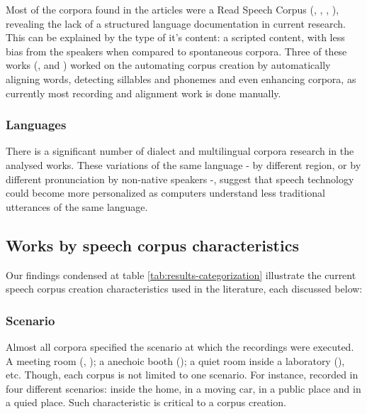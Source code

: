 \documentclass[conference]{IEEEtran}
\begin{document}
Most of the corpora found in the articles were a Read Speech Corpus (\cite{almeman2018building}, \cite{ruilan2016improving}, \cite{klessa2013paralingua}, \cite{clopper2006nationwide}), revealing the lack of a structured language documentation in current research. This can be explained by the type of it's content: a scripted content, with less bias from the speakers when compared to spontaneous corpora. Three of these works (\cite{ng2017shefce}, \cite{mansikkaniemi2017automatic} and \cite{nagino2008building}) worked on the automating corpus creation by automatically aligning words, detecting sillables and phonemes and even enhancing corpora, as currently most recording and alignment work is done manually.

\subsubsection{Languages}

There is a significant number of dialect and multilingual corpora research in the analysed works. These variations of the same language - by different region, or by different pronunciation by non-native speakers -, suggest that speech technology could become more personalized as computers understand less traditional utterances of the same language.

\subsection{Works by speech corpus characteristics}

Our findings condensed at table \ref{tab:results-categorization} illustrate the
current speech corpus creation characteristics used in the literature, each discussed below:

\subsubsection{Scenario}

Almost all corpora specified the scenario at which the recordings were executed. A meeting room (\cite{liu2016sheffield}, \cite{moore2017sheffield}); a anechoic booth (\cite{goldman2016siwis}); a quiet room inside a laboratory (\cite{ramli2017first}), etc. Though, each corpus is not limited to one scenario. For instance, \cite{almeman2018building} recorded in four different scenarios: inside the home, in a moving car, in a public place and in a quied place. Such characteristic is critical to a corpus creation.
\end{document}
